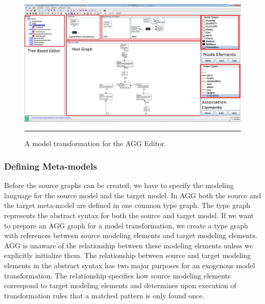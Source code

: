 \begin{figure}[H]
  \centering
    \includegraphics[scale=0.3]{figures/AGGscreen.png}
    \rule{35em}{0.5pt}
  \caption[Graphical Editor for AGG]
  {A model transformation for the AGG Editor.}
  \label{fig:AGGScreen}
\end{figure}

\subsubsection*{Defining Meta-models}

Before the source graphs can be created, we have to specify the modeling
language for the source model and the target model. In AGG both the source and the
target meta-model are defined in one common type graph. The type graph
represents the abstract syntax for both the source and target model. If we want
to prepare an AGG graph for a model transformation, we create a type graph with
references between source modeling elements and target modeling elements. AGG is
unaware of the relationship between these modeling elements unless we explicitly
initialize them. The relationship between source and target modeling elements in
the abstract syntax has two major purposes for an exogenous model
transformation. The relationship specifies how source modeling elements
correspond to target modeling elements and determines upon execution of
transformation rules that a matched pattern is only found once. 

